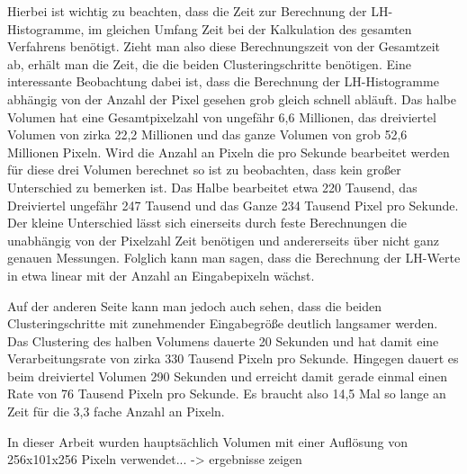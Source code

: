 Hierbei ist wichtig zu beachten, dass die Zeit zur Berechnung der LH-Histogramme, im gleichen Umfang Zeit bei der Kalkulation des gesamten Verfahrens benötigt. Zieht man also diese Berechnungszeit von der Gesamtzeit ab, erhält man die Zeit, die die beiden Clusteringschritte benötigen.
Eine interessante Beobachtung dabei ist, dass die Berechnung der LH-Histogramme abhängig von der Anzahl der Pixel gesehen grob gleich schnell abläuft. Das halbe Volumen hat eine Gesamtpixelzahl von ungefähr 6,6 Millionen, das dreiviertel Volumen von zirka 22,2 Millionen und das ganze Volumen von grob 52,6 Millionen Pixeln. Wird die Anzahl an Pixeln die pro Sekunde bearbeitet werden für diese drei Volumen berechnet so ist zu beobachten, dass kein großer Unterschied  zu bemerken ist. Das Halbe bearbeitet etwa 220 Tausend, das Dreiviertel ungefähr 247 Tausend und das Ganze 234 Tausend Pixel pro Sekunde. Der kleine Unterschied lässt sich einerseits durch feste Berechnungen die unabhängig von der Pixelzahl Zeit benötigen und andererseits über nicht ganz genauen Messungen. Folglich kann man sagen, dass die Berechnung der LH-Werte in etwa linear mit der Anzahl an Eingabepixeln wächst.

Auf der anderen Seite kann man jedoch auch sehen, dass die beiden Clusteringschritte mit zunehmender Eingabegröße deutlich langsamer werden. Das Clustering des halben Volumens dauerte 20 Sekunden und hat damit eine Verarbeitungsrate von zirka 330 Tausend Pixeln pro Sekunde. Hingegen dauert es beim dreiviertel Volumen 290 Sekunden und erreicht damit gerade einmal einen Rate von 76 Tausend Pixeln pro Sekunde. Es braucht also 14,5 Mal so lange an Zeit für die 3,3 fache Anzahl an Pixeln.






 In dieser Arbeit wurden hauptsächlich Volumen mit einer Auflösung von 256x101x256 Pixeln verwendet... -> ergebnisse zeigen